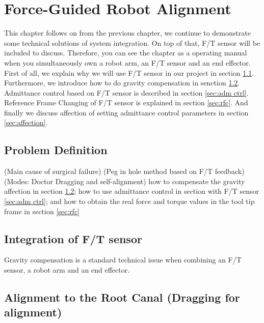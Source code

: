 \chapter{Force-Guided Robot Alignment}
This chapter follows on from the previous chapter, we continue to demonstrate some technical solutions of system integration. On top of that, F/T sensor will be included to discuss. Therefore, you can see the chapter as a operating manual when you simultaneously own a robot arm, an F/T sensor and an end effector. First of all, we explain why we will use F/T sensor in our project in section \ref{sec:pro def}. Furthermore, we introduce how to do gravity compensation in senction \ref{sec:grav compen}. Admittance control based on F/T sensor is described in section \ref{sec:adm ctrl}. Reference Frame Changing of F/T sensor is explained in section \ref{sec:rfc}. And finally we discuss affection of setting admittance control parameters in section \ref{sec:affection}.
\section{Problem Definition}
\label{sec:pro def}
(Main cause of surgical failure)
(Peg in hole method based on F/T feedback)
(Modes: Doctor Dragging and self-alignment)
how to compensate the gravity affection in section \ref{sec:grav compen}; how to use admittance control in section with F/T sensor \ref{sec:adm ctrl}; and how to obtain the real force and torque values in the tool tip frame in section \ref{sec:rfc}
\section{Integration of F/T sensor}
\label{sec:grav compen}
Gravity compensation is a standard technical issue when combining an F/T sensor, a robot arm and an end effector.
\section{Alignment to the Root Canal (Dragging for alignment)}

